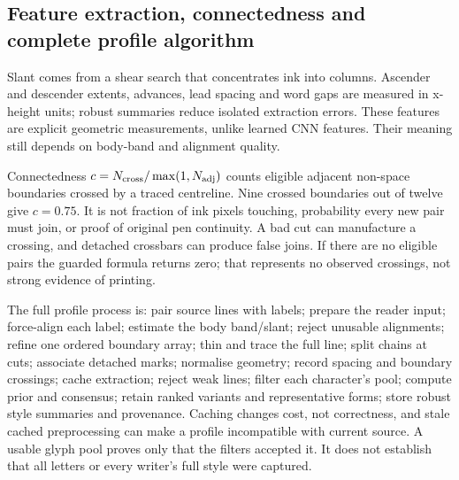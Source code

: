 \subsection{Feature extraction, connectedness and complete profile algorithm}
Slant comes from a shear search that concentrates ink into columns. Ascender
and descender extents, advances, lead spacing and word gaps are measured in
x-height units; robust summaries reduce isolated extraction errors. These
features are explicit geometric measurements, unlike learned CNN features.
Their meaning still depends on body-band and alignment quality.

Connectedness $c=N_{\rm cross}/\max(1,N_{\rm adj})$ counts eligible adjacent
non-space boundaries crossed by a traced centreline. Nine crossed boundaries
out of twelve give $c=0.75$. It is not fraction of ink pixels touching,
probability every new pair must join, or proof of original pen continuity.
A bad cut can manufacture a crossing, and detached crossbars can produce
false joins. If there are no eligible pairs the guarded formula returns zero;
that represents no observed crossings, not strong evidence of printing.

The full profile process is: pair source lines with labels; prepare the
reader input; force-align each label; estimate the body band/slant; reject
unusable alignments; refine one ordered boundary array; thin and trace the
full line; split chains at cuts; associate detached marks; normalise geometry;
record spacing and boundary crossings; cache extraction; reject weak lines;
filter each character's pool; compute prior and consensus; retain ranked
variants and representative forms; store robust style summaries and provenance.
Caching changes cost, not correctness, and stale cached preprocessing can
make a profile incompatible with current source. A usable glyph pool proves
only that the filters accepted it. It does not establish that all letters
or every writer's full style were captured.
